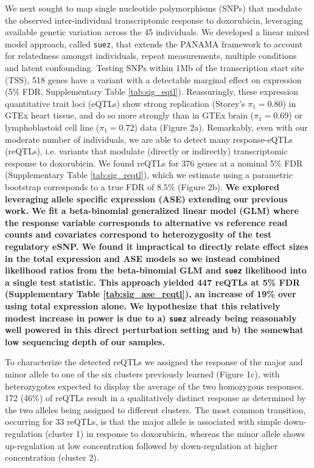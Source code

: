 \documentclass{article}
\newcommand{\tempbold}[1]{\textbf{#1}}
\begin{document}
We next sought to map single nucleotide polymorphisms (SNPs) that modulate the observed inter-individual transcriptomic response to doxorubicin, leveraging available genetic variation across the 45 individuals\cite{Livne2015}. We developed a linear mixed model approach, called \texttt{suez}, that extends the PANAMA framework\citep{Fusi2012} to account for relatedness amongst individuals, repeat measurements, multiple conditions and latent confounding. Testing SNPs within 1Mb of the transcription start site (TSS), 518 genes have a variant with a detectable marginal effect on expression (5\% FDR, Supplementary Table \ref{tab:sig_eqtl}). Reassuringly, these expression quantitative trait loci (eQTLs) show strong replication (Storey's $\pi_1=0.80$) in GTEx heart tissue, and do so more strongly than in GTEx brain ($\pi_1=0.69$) or lymphoblastoid cell line ($\pi_1=0.72$) data (Figure 2a). Remarkably, even with our moderate number of individuals, we are able to detect many response-eQTLs (reQTLs), i.e. variants that modulate (directly or indirectly) transcriptomic response to doxorubicin. We found reQTLs for 376 genes at a nominal 5\% FDR (Supplementary Table \ref{tab:sig_reqtl}), which we estimate using a parametric bootstrap corresponds to a true FDR of $8.5\%$ (Figure 2b). \tempbold{We explored leveraging allele specific expression (ASE) extending our previous work\cite{Knowles2017-yp,Van_de_Geijn2015-nm}. We fit a beta-binomial generalized linear model (GLM) where the response variable corresponds to alternative vs reference read counts and covariates correspond to heterozygosity of the test regulatory eSNP. We found it impractical to directly relate effect sizes in the total expression and ASE models so we instead combined likelihood ratios from the beta-binomial GLM and \texttt{suez} likelihood into a single test statistic. This approach yielded 447 reQTLs at 5\% FDR (Supplementary Table \ref{tab:sig_ase_reqtl}), an increase of 19\% over using total expression alone. We hypothesize that this relatively modest increase in power is due to a) \texttt{suez} already being reasonably well powered in this direct perturbation setting and b) the somewhat low sequencing depth of our samples.}

To characterize the detected reQTLs we assigned the response of the major and minor allele to one of the six clusters previously learned (Figure 1c), with heterozygotes expected to display the average of the two homozygous responses. 172 (46\%) of reQTLs result in a qualitatively distinct response as determined by the two alleles being assigned to different clusters. The most common transition, occurring for 33 reQTLs, is that the major allele is associated with simple down-regulation (cluster 1) in response to doxorubicin, whereas the minor allele shows up-regulation at low concentration followed by down-regulation at higher concentration (cluster 2). 
\end{document}
